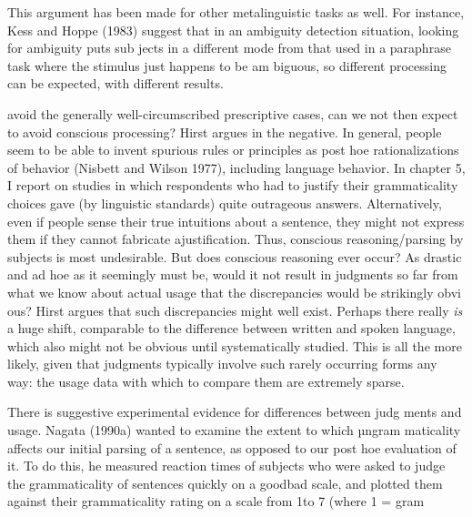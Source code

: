 \begin{listWWNumxlviileveli}
\item 
\begin{styleStandard}
This argument has been made for other metalinguistic tasks as well. For instance, Kess and Hoppe (1983) suggest that in an ambiguity detection situation, looking for ambiguity puts sub\- jects in a different mode from that used in a paraphrase task where the stimulus just happens to be am\- biguous, so different processing can be expected, with different results.
\end{styleStandard}


\end{listWWNumxlviileveli}
\clearpage\setcounter{page}{1}\begin{styleStandard}
avoid the generally well-circumscribed prescriptive cases, can we not then expect to avoid conscious processing? Hirst argues in the negative. In general, people seem to be able to invent spurious rules or principles as post hoe rationalizations of behavior (Nisbett and Wilson 1977), including language behavior. In chapter 5, I report on studies in which respondents who had to justify their grammaticality choices gave (by linguistic standards) quite outrageous answers. Alternatively, even if people sense their true intuitions about a sentence, they might not express them if they cannot fabricate ajustification. Thus, conscious reasoning/parsing by subjects is most undesirable. But does conscious reasoning ever occur? As drastic and ad hoe as it seemingly must be, would it not result in judgments so far from what we know about actual usage that the discrepancies would be strikingly obvi\- ous? Hirst argues that such discrepancies might well exist. Perhaps there really \textit{is}\textit{ }a huge shift, comparable to the difference between written and spoken language, which also might not be obvious until systematically studied. This is all the more likely, given that judgments typically involve such rarely occurring forms any\- way: the usage data with which to compare them are extremely sparse.
\end{styleStandard}


\begin{styleStandard}
There is suggestive experimental evidence for differences between judg\- ments and usage. Nagata (1990a) wanted to examine the extent to which µngram\- maticality affects our initial parsing of a sentence, as opposed to our post hoe evaluation of it. To do this, he measured reaction times of subjects who were asked to judge the grammaticality of sentences quickly on a goodbad scale, and plotted them against their grammaticality rating on a scale from 1to 7 (where 1 = gram\-
\end{styleStandard}


